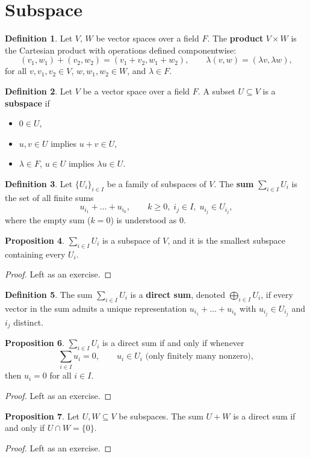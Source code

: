 \documentclass{book}
\theoremstyle{definition}
\newtheorem{definition}{Definition}[section]
\newtheorem{proposition}[definition]{Proposition}
\begin{document}
\section{Subspace}

\begin{definition}
Let $V$, $W$ be vector spaces over a field $F$. The \textbf{product} $V \times W$ is the Cartesian product with operations defined componentwise:
\[
(v_1, w_1) + (v_2, w_2) = (v_1 + v_2, w_1 + w_2), \qquad
\lambda(v, w) = (\lambda v, \lambda w),
\]
for all $v, v_1, v_2 \in V$, $w, w_1, w_2 \in W$, and $\lambda \in F$.
\end{definition}

\begin{definition}
Let $V$ be a vector space over a field $F$. A subset $U \subseteq V$ is a \textbf{subspace} if
\begin{itemize}
    \item $0 \in U$,
    \item $u, v \in U$ implies $u + v \in U$,
    \item $\lambda \in F$, $u \in U$ implies $\lambda u \in U$.
\end{itemize}
\end{definition}

\begin{definition}
Let $\{U_{i}\}_{i \in I}$ be a family of subspaces of $V$.
The \textbf{sum} $\sum_{i \in I} U_{i}$ is the set of all finite sums
\[
u_{i_{1}} + \dots + u_{i_{k}}, \qquad k \geq 0,\; i_{j} \in I,\; u_{i_{j}} \in U_{i_{j}},
\]
where the empty sum ($k = 0$) is understood as $0$.
\end{definition}

\begin{proposition}
$\sum_{i \in I} U_{i}$ is a subspace of $V$, and it is the smallest subspace containing every $U_{i}$.
\end{proposition}

\begin{proof}
Left as an exercise.
\end{proof}

\begin{definition}
The sum $\sum_{i \in I} U_{i}$ is a \textbf{direct sum}, denoted $\bigoplus_{i \in I} U_{i}$, if every vector in the sum admits a unique representation $u_{i_{1}} + \dots + u_{i_{k}}$ with $u_{i_{j}} \in U_{i_{j}}$ and $i_{j}$ distinct.
\end{definition}

\begin{proposition}
$\sum_{i \in I} U_{i}$ is a direct sum if and only if whenever
\[
\sum_{i \in I} u_{i} = 0, \qquad u_{i} \in U_{i}\text{ (only finitely many nonzero)},
\]
then $u_{i} = 0$ for all $i \in I$.
\end{proposition}

\begin{proof}
Left as an exercise.
\end{proof}

\begin{proposition}
Let $U, W \subseteq V$ be subspaces. The sum $U + W$ is a direct sum if and only if $U \cap W = \{0\}$.
\end{proposition}

\begin{proof}
Left as an exercise.
\end{proof}
\end{document}

